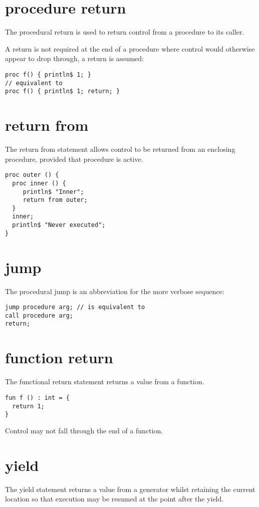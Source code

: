 \documentclass[oneside]{book}
\begin{document}
\section{procedure return}
The procedural return is used to return control
from a procedure to its caller.

A return is not required at the end of a procedure
where control would otherwise appear to drop through,
a return is assumed:

\begin{verbatim}
proc f() { println$ 1; }
// equivalent to
proc f() { println$ 1; return; }
\end{verbatim}


\section{return from}
The return from statement allows control to be
returned from an enclosing procedure, provided that
procedure is active.

\begin{verbatim}
proc outer () {
  proc inner () {
     println$ "Inner";
     return from outer;
  }
  inner;
  println$ "Never executed";
}
\end{verbatim}


\section{jump }
The procedural jump is an abbreviation for 
the more verbose sequence:

\begin{verbatim}
jump procedure arg; // is equivalent to
call procedure arg;
return;
\end{verbatim}


\section{function return}
The functional return statement returns a value from
a function.

\begin{verbatim}
fun f () : int = {
  return 1;
}
\end{verbatim}

Control may not fall through the end of a function.

\section{yield}
The yield statement returns a value from a generator
whilst retaining the current location so that execution
may be resumed at the point after the yield.
\end{document}
